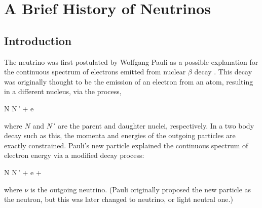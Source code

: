 
\chapter{A Brief History of Neutrinos}


\section{Introduction}

The neutrino was first postulated by Wolfgang Pauli as a possible explanation for the continuous spectrum of electrons emitted from nuclear $\beta$ decay \cite{Pauli}. This decay was originally thought to be the emission of an electron from an atom, resulting in a different nucleus, via the process,

\beq
N \rightarrow N\,' + e
\label{eq:BetaWrong}
\eeq

\n where $N$ and $N\,'$ are the parent and daughter nuclei, respectively. In a two body decay such as this, the momenta and energies of the outgoing particles are exactly constrained. Pauli's new particle explained the continuous spectrum of electron energy via a modified decay process:

\beq
N \rightarrow N\,' + e + \nu
\label{eq:BetaRight}
\eeq

\n where $\nu$ is the outgoing neutrino. (Pauli originally proposed the new particle as the neutron, but this was later changed to neutrino, or light neutral one.)

